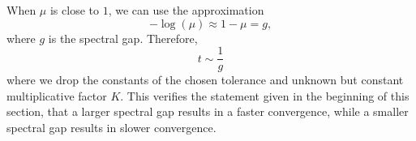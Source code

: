 When \(\mu\) is close to \(1\), we can use the approximation
\[
-\log(\mu)\approx 1-\mu=g,
\]
where \(g\) is the spectral gap. Therefore,
\[
t \sim \frac{1}{g}
\]
where we drop the constants of the chosen tolerance and unknown but constant multiplicative factor $K$.
This verifies the statement given in the beginning of this section, that a larger spectral gap results in a faster convergence, while a smaller spectral gap results in slower convergence.


